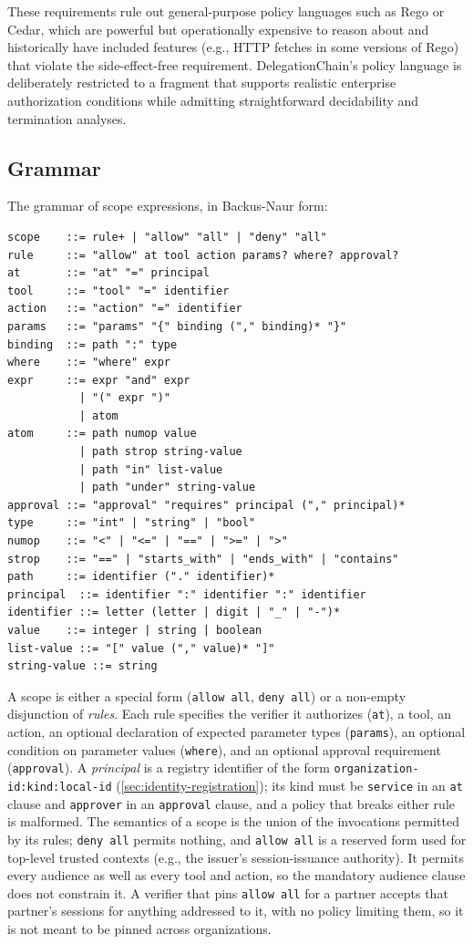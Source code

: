 \documentclass[11pt,a4paper]{article}
\begin{document}
These requirements rule out general-purpose policy languages such as
Rego or Cedar, which are powerful but operationally expensive to reason
about and historically have included features (e.g., HTTP fetches in
some versions of Rego) that violate the side-effect-free requirement.
DelegationChain's policy language is deliberately restricted to a
fragment that supports realistic enterprise authorization conditions
while admitting straightforward decidability and termination analyses.

\subsection{Grammar}
\label{sec:policy-grammar}

The grammar of scope expressions, in Backus-Naur form:

\begin{lstlisting}[basicstyle=\ttfamily\footnotesize]
scope    ::= rule+ | "allow" "all" | "deny" "all"
rule     ::= "allow" at tool action params? where? approval?
at       ::= "at" "=" principal
tool     ::= "tool" "=" identifier
action   ::= "action" "=" identifier
params   ::= "params" "{" binding ("," binding)* "}"
binding  ::= path ":" type
where    ::= "where" expr
expr     ::= expr "and" expr
           | "(" expr ")"
           | atom
atom     ::= path numop value
           | path strop string-value
           | path "in" list-value
           | path "under" string-value
approval ::= "approval" "requires" principal ("," principal)*
type     ::= "int" | "string" | "bool"
numop    ::= "<" | "<=" | "==" | ">=" | ">"
strop    ::= "==" | "starts_with" | "ends_with" | "contains"
path     ::= identifier ("." identifier)*
principal  ::= identifier ":" identifier ":" identifier
identifier ::= letter (letter | digit | "_" | "-")*
value    ::= integer | string | boolean
list-value ::= "[" value ("," value)* "]"
string-value ::= string
\end{lstlisting}

A scope is either a special form (\texttt{allow all}, \texttt{deny all})
or a non-empty disjunction of \emph{rules}. Each rule specifies the
verifier it authorizes (\texttt{at}), a tool, an action, an optional
declaration of expected parameter types
(\texttt{params}), an optional condition on parameter values
(\texttt{where}), and an optional approval requirement
(\texttt{approval}). A \emph{principal} is a registry identifier of the
form \texttt{organization-id:kind:local-id} (\cref{sec:identity-registration});
its kind must be \texttt{service} in an \texttt{at} clause and
\texttt{approver} in an \texttt{approval} clause, and a policy that
breaks either rule is malformed. The semantics of a scope is the union of the
invocations permitted by its rules; \texttt{deny all} permits nothing,
and \texttt{allow all} is a reserved form used for top-level trusted
contexts (e.g., the issuer's session-issuance authority). It permits
every audience as well as every tool and action, so the mandatory
audience clause does not constrain it. A verifier that pins
\texttt{allow all} for a partner accepts that partner's sessions for
anything addressed to it, with no policy limiting them, so it is not
meant to be pinned across organizations.
\end{document}

